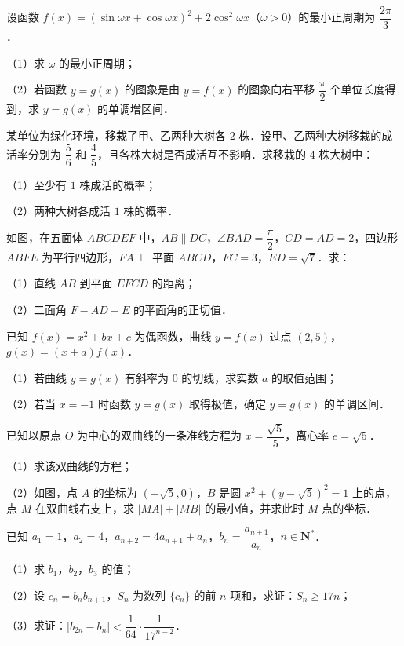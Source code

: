 \begin{question}
设函数 $f(x)=(\sin\omega x+\cos\omega x)^2+2\cos^2\omega x$（$\omega>0$）的最小正周期为 $\dfrac{2\pi}3$．

（1）求 $\omega$ 的最小正周期；

（2）若函数 $y=g(x)$ 的图象是由 $y=f(x)$ 的图象向右平移 $\dfrac\pi2$ 个单位长度得到，求 $y=g(x)$ 的单调增区间．

\end{question}
\begin{question}
某单位为绿化环境，移栽了甲、乙两种大树各 $2$ 株．设甲、乙两种大树移栽的成活率分别为 $\dfrac56$ 和 $\dfrac45$，且各株大树是否成活互不影响．求移栽的 $4$ 株大树中：

（1）至少有 $1$ 株成活的概率；

（2）两种大树各成活 $1$ 株的概率．

\Needspace{0.4\textheight}
\end{question}
\begingroup
\renewenvironment{question}{\Needspace{0.5\textheight}}{}
\begin{question}
如图，在五面体 $ABCDEF$ 中，$AB\parallel DC$，$\angle BAD=\dfrac\pi2$，$CD=AD=2$，四边形 $ABFE$ 为平行四边形，$FA\perp$ 平面 $ABCD$，$FC=3$，$ED=\sqrt7$．求：

（1）直线 $AB$ 到平面 $EFCD$ 的距离；

（2）二面角 $F-AD-E$ 的平面角的正切值．
\nopagebreak[4]
\begin{center}\end{center}
\nopagebreak[4]
\end{question}
\endgroup
\begin{question}
已知 $f(x)=x^2+bx+c$ 为偶函数，曲线 $y=f(x)$ 过点 $(2,5)$，$g(x)=(x+a)f(x)$．

（1）若曲线 $y=g(x)$ 有斜率为 $0$ 的切线，求实数 $a$ 的取值范围；

（2）若当 $x=-1$ 时函数 $y=g(x)$ 取得极值，确定 $y=g(x)$ 的单调区间．

\Needspace{0.4\textheight}
\end{question}
\begingroup
\renewenvironment{question}{\Needspace{0.5\textheight}}{}
\begin{question}
已知以原点 $O$ 为中心的双曲线的一条准线方程为 $x=\dfrac{\sqrt5}5$，离心率 $e=\sqrt5$．

（1）求该双曲线的方程；

（2）如图，点 $A$ 的坐标为 $(-\sqrt5,0)$，$B$ 是圆 $x^2+(y-\sqrt5)^2=1$ 上的点，点 $M$ 在双曲线右支上，求 $|MA|+|MB|$ 的最小值，并求此时 $M$ 点的坐标．
\nopagebreak[4]
\begin{center}\end{center}
\nopagebreak[4]
\end{question}
\endgroup
\begin{question}
已知 $a_1=1$，$a_2=4$，$a_{n+2}=4a_{n+1}+a_n$，$b_n=\dfrac{a_{n+1}}{a_n}$，$n\in\mathbf N^*$．

（1）求 $b_1$，$b_2$，$b_3$ 的值；

（2）设 $c_n=b_nb_{n+1}$，$S_n$ 为数列 $\{c_n\}$ 的前 $n$ 项和，求证：$S_n\geqslant17n$；

（3）求证：$|b_{2n}-b_n|<\dfrac1{64}\cdot\dfrac1{17^{n-2}}$．

\end{question}